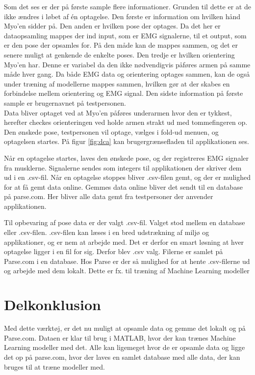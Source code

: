 Som det ses er der på første sample flere informationer. Grunden til dette er at de ikke ændres i løbet af én optagelse. Den første er information om hvilken hånd Myo'en sidder på. Den anden er hvilken pose der optages. Da det her er dataopsamling mappes der ind input, som er EMG signalerne, til et output, som er den pose der opsamles for. På den måde kan de mappes sammen, og det er senere muligt at genkende de enkelte poses. Den tredje er hvilken orientering Myo'en har. Denne er variabel da den ikke nødvendigvis påføres armen på samme måde hver gang. Da både EMG data og orientering optages sammen, kan de også under træning af modellerne mappes sammen, hvilken gør at der skabes en forbindelse mellem orientering og EMG signal. Den sidste information på første sample er brugernavnet på testpersonen.\\
Data bliver optaget ved at Myo'en påføres underarmen hvor den er tykkest, herefter checkes orienteringen ved holde armen strakt ud med tommefingeren op. Den ønskede pose, testpersonen vil optage, vælges i fold-ud menuen, og optagelsen startes. På figur \ref{fig:dca} kan brugergrænsefladen til applikationen ses.


Når en optagelse startes, laves den ønskede pose, og der registreres EMG signaler fra musklerne. Signalerne sendes som integers til applikationen der skriver dem ud i en .csv-fil. Når en optagelse stoppes bliver .csv-filen gemt, og der er mulighed for at få gemt data online. Gemmes data online bliver det sendt til en database på parse.com\citep{RefWorks:11}. Her bliver alle data gemt fra testpersoner der anvender applikationen.

Til opbevaring af pose data er der valgt .csv-fil. Valget stod mellem en database eller .csv-filen. .csv-filen kan læses i en bred udstrækning af miljø og applikationer, og er nem at arbejde med. Det er derfor en smart løsning at hver optagelse ligger i en fil for sig. Derfor blev .csv valg. Filerne er samlet på Parse.com i en database. Hos Parse er der så mulighed for at hente .csv-filerne ud og arbejde med dem lokalt. Dette er fx. til træning af Machine Learning modeller

\section{Delkonklusion}
Med dette værktøj, er det nu muligt at opsamle data og gemme det lokalt og på Parse.com. Dataen er klar til brug i MATLAB, hvor der kan trænes Machine Learning modeller med det. Alle kan ligemeget hvor de er opsamle data og ligge det op på parse.com, hvor der laves en samlet database med alle data, der kan bruges til at træne modeller med. 